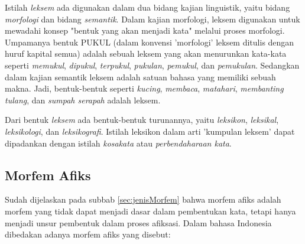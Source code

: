 Istilah \textit{leksem} ada digunakan dalam dua bidang kajian linguistik, yaitu bidang \textit{morfologi} dan bidang \textit{semantik}. Dalam kajian morfologi, leksem digunakan untuk mewadahi konsep "bentuk yang akan menjadi kata" melalui proses morfologi. Umpamanya bentuk PUKUL (dalam konvensi 'morfologi' leksem ditulis dengan huruf kapital semua) adalah sebuah leksem yang akan menurunkan kata-kata seperti \textit{memukul}, \textit{dipukul}, \textit{terpukul}, \textit{pukulan}, \textit{pemukul}, dan \textit{pemukulan}. Sedangkan dalam kajian semantik leksem adalah satuan bahasa yang memiliki sebuah makna. Jadi, bentuk-bentuk seperti \textit{kucing}, \textit{membaca}, \textit{matahari}, \textit{membanting tulang}, dan \textit{sumpah serapah} adalah leksem.

Dari bentuk \textit{leksem} ada bentuk-bentuk turunannya, yaitu \textit{leksikon}, \textit{leksikal}, \textit{leksikologi}, dan \textit{leksikografi}. Istilah leksikon dalam arti 'kumpulan leksem' dapat dipadankan dengan istilah \textit{kosakata} atau \textit{perbendaharaan kata}.


\subsection{Morfem Afiks}
\label{sec:morfemAfiks}

Sudah dijelaskan pada subbab \ref{sec:jenisMorfem} bahwa morfem afiks adalah morfem yang tidak dapat menjadi dasar dalam pembentukan kata, tetapi hanya menjadi unsur pembentuk dalam proses afiksasi. Dalam bahasa Indonesia dibedakan adanya morfem afiks yang disebut:

